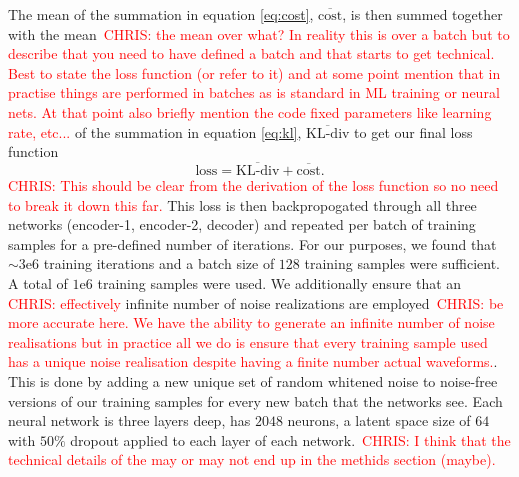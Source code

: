 \documentclass[%
showpacs,
 amsmath,amssymb,
 aps,
 twocolumn,
 prl,
 reprint,
floatfix,
]{revtex4-1}
\newcommand{\chris}[1]{\textcolor{red}{CHRIS: #1}}
\begin{document}
The mean of the summation in equation \ref{eq:cost},
$\overline{\textrm{cost}}$, is then summed together with the mean~\chris{the
mean over what? In reality this is over a batch but to describe that you need
to have defined a batch and that starts to get technical. Best to state the
loss function (or refer to it) and at some point mention that in practise
things are performed in batches as is standard in ML training or neural nets.
At that point also briefly mention the code fixed parameters like learning
rate, etc...} of the summation in equation \ref{eq:kl},
$\overline{\textrm{KL-div}}$ to get our final loss function
%
\begin{equation} 
\textrm{loss} = \overline{\textrm{KL-div}} + \overline{\textrm{cost}}.  
\end{equation}
%
\chris{This should be clear from the derivation of the loss function so no need
to break it down this far.} This loss is then backpropogated through all three
networks (encoder-1, encoder-2, decoder) and repeated per batch of training
samples for a pre-defined number of iterations. For our purposes, we found that
$\sim3\textrm{e}6$ training iterations and a batch size of $128$ training
samples were sufficient. A total of $1\textrm{e}6$ training samples were used.
We additionally ensure that an \chris{effectively} infinite number of noise
realizations are employed~\chris{be more accurate here. We have the ability to
generate an infinite number of noise realisations but in practice all we do is
ensure that every training sample used has a unique noise realisation despite
having a finite number actual waveforms.}. This is done by adding a new unique
set of random whitened noise to noise-free versions of our training samples for
every new batch that the networks see. Each neural network is three layers
deep, has $2048$ neurons, a latent space size of $64$ with $50\%$ dropout
applied to each layer of each network.~\chris{I think that the technical
details of the may or may not end up in the methids section (maybe).}
\end{document}
